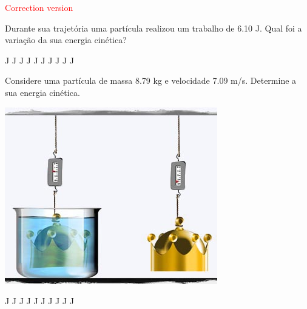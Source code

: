 \documentclass[12pt, addpoints]{exam}
\begin{document}
\begin{center}
\textcolor{red}{\emph\Large Correction version}\end{center}
\begin{questions}
\begin{multicols}{2}
\question[33] 
            Durante sua trajetória uma partícula realizou um trabalho de    6.10 J. Qual foi a variação da sua energia cinética?
        

\begin{oneparchoices}
 J J J J J J J J J J\end{oneparchoices}

\begin{oneparchoices}
\end{oneparchoices}
\question[23] 
            Considere uma partícula de massa    8.79 kg e velocidade    7.09 m/s. Determine a sua energia cinética.
        

\begin{center}
\begin{minipage}[c]{0.75\linewidth}
\includegraphics[width=\textwidth]{MWE001.jpg}
\end{minipage}

\end{center}
\begin{oneparchoices}
 J J J J J J J J J J\end{oneparchoices}

\begin{oneparchoices}
\end{oneparchoices}
\end{multicols}
\end{questions}
\newpage
\end{document}

